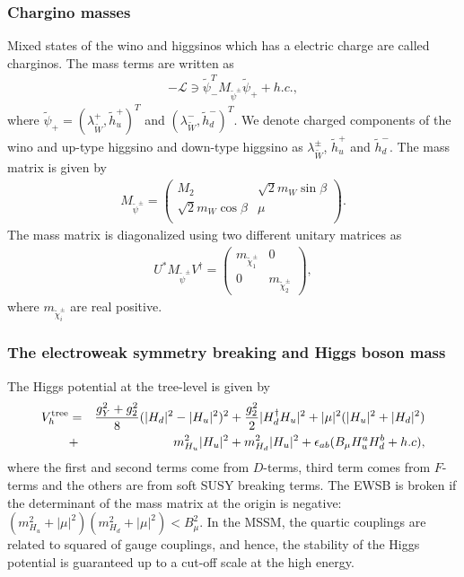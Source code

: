 \documentclass[preprint,3p,12pt]{elsarticle}
\begin{document}
\subsubsection{Chargino masses}
Mixed states of the wino and higgsinos which has a electric charge are called charginos. 
The mass terms are written as
\begin{eqnarray}
-\mathcal{L} \ni \tilde \psi_{-}^T M_{\tilde \psi^{\pm}} \tilde \psi_{+} + h.c.,
\end{eqnarray}
where $\tilde \psi_{+} = (\lambda_{\tilde W}^+, \tilde h_u^+)^T$ and $(\lambda_{\tilde W}^-, \tilde h_d^-)^T$. We denote charged components of the wino and up-type higgsino and down-type higgsino as $\lambda_{\tilde W}^{\pm}$, $\tilde h_u^+$ and $\tilde h_d^-$. The mass matrix is given by 
\begin{eqnarray}
M_{\tilde \psi^{\pm}}=
\left(
\begin{array}{cc}
M_2  &  \sqrt{2} m_W \sin\beta    \\
 \sqrt{2} m_W \cos\beta  &  \mu    \\
\end{array}
\right).
\end{eqnarray}
The mass matrix is diagonalized using two different  unitary matrices as
\begin{eqnarray}
U^* M_{\tilde \psi^{\pm}} V^\dag = \left(
\begin{array}{cc}
m_{{\tilde \chi}_1^\pm}  &  0  \\
  0 &   m_{{\tilde \chi}_2^\pm}
\end{array}
\right),
\end{eqnarray}
where $m_{{\tilde \chi}_i^\pm}$ are real positive.


\subsubsection{The electroweak symmetry breaking and Higgs boson mass}
The Higgs potential at the tree-level is given by
\begin{eqnarray}
V_{h}^{\rm tree} &=& \frac{g_Y^2 + g_2^2}{8}(|H_d|^2 - |H_u|^2)^2 + \frac{g_2^2}{2} |H_d^\dag H_u|^2 
+ |\mu|^2 ( |H_u|^2 + |H_d|^2) \nonumber \\
&+& m_{H_u}^2 |H_u|^2 + m_{H_d}^2 |H_u|^2 + \epsilon_{ab} (B_\mu H_u^a H_d^b + h.c),
\end{eqnarray}
where the first and second terms come from $D$-terms, third term comes from $F$-terms and the others are from soft SUSY breaking terms. The EWSB is broken if the determinant of the mass matrix at the origin is negative: $(m_{H_u}^2 + |\mu|^2)(m_{H_d}^2 + |\mu|^2) < B_\mu^2$. 
In the MSSM, the quartic couplings are related to squared of gauge couplings, and hence, the stability of the Higgs potential is guaranteed up to a cut-off scale at the high energy. 
\end{document}
